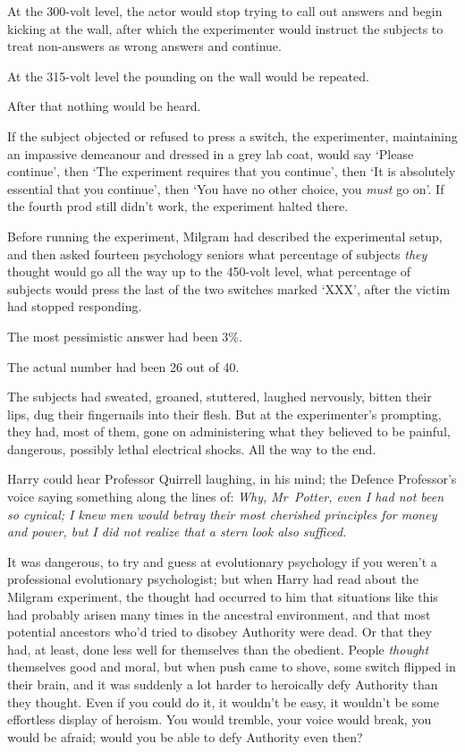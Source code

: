 At the 300-volt level, the actor would stop trying to call out answers and begin kicking at the wall, after which the experimenter would instruct the subjects to treat non-answers as wrong answers and continue.

At the 315-volt level the pounding on the wall would be repeated.

After that nothing would be heard.

If the subject objected or refused to press a switch, the experimenter, maintaining an impassive demeanour and dressed in a grey lab coat, would say ‘Please continue’, then ‘The experiment requires that you continue’, then ‘It is absolutely essential that you continue’, then ‘You have no other choice, you \emph{must} go on’. If the fourth prod still didn’t work, the experiment halted there.

Before running the experiment, Milgram had described the experimental setup, and then asked fourteen psychology seniors what percentage of subjects \emph{they} thought would go all the way up to the 450-volt level, what percentage of subjects would press the last of the two switches marked ‘XXX’, after the victim had stopped responding.

The most pessimistic answer had been 3\%.

The actual number had been 26 out of 40.

The subjects had sweated, groaned, stuttered, laughed nervously, bitten their lips, dug their fingernails into their flesh. But at the experimenter’s prompting, they had, most of them, gone on administering what they believed to be painful, dangerous, possibly lethal electrical shocks. All the way to the end.

Harry could hear Professor Quirrell laughing, in his mind; the Defence Professor’s voice saying something along the lines of: \emph{Why, Mr~Potter, even I had not been so cynical; I knew men would betray their most cherished principles for money and power, but I did not realize that a stern look also sufficed.}

It was dangerous, to try and guess at evolutionary psychology if you weren’t a professional evolutionary psychologist; but when Harry had read about the Milgram experiment, the thought had occurred to him that situations like this had probably arisen many times in the ancestral environment, and that most potential ancestors who’d tried to disobey Authority were dead. Or that they had, at least, done less well for themselves than the obedient. People \emph{thought} themselves good and moral, but when push came to shove, some switch flipped in their brain, and it was suddenly a lot harder to heroically defy Authority than they thought. Even if you could do it, it wouldn’t be easy, it wouldn’t be some effortless display of heroism. You would tremble, your voice would break, you would be afraid; would you be able to defy Authority even then?

